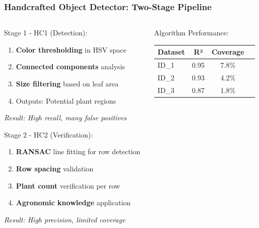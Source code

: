 \documentclass[aspectratio=43]{beamer}
\begin{document}
\begin{frame}
    \frametitle{Handcrafted Object Detector: Two-Stage Pipeline}
    
    \begin{columns}
        \begin{column}{0.5\textwidth}
            \begin{block}{Stage 1 - HC1 (Detection):}
                \small
                \begin{enumerate}
                    \item \textbf{Color thresholding} in HSV space
                    \item \textbf{Connected components} analysis
                    \item \textbf{Size filtering} based on leaf area
                    \item Outputs: Potential plant regions
                \end{enumerate}
                
                \textit{Result: High recall, many false positives}
            \end{block}
            
            \begin{block}{Stage 2 - HC2 (Verification):}
                \small
                \begin{enumerate}
                    \item \textbf{RANSAC} line fitting for row detection
                    \item \textbf{Row spacing} validation
                    \item \textbf{Plant count} verification per row
                    \item \textbf{Agronomic knowledge} application
                \end{enumerate}
                
                \textit{Result: High precision, limited coverage}
            \end{block}
        \end{column}
        
        \begin{column}{0.5\textwidth}
            \begin{exampleblock}{Algorithm Performance:}
                \small
                \begin{center}
                    \scriptsize
                    \begin{tabular}{lccc}
                        \textbf{Dataset} & \textbf{R²} & \textbf{Coverage} \\
                        \hline
                        ID\_1 & 0.95 & 7.8\% \\
                        ID\_2 & 0.93 & 4.2\% \\
                        ID\_3 & 0.87 & 1.8\% \\
                    \end{tabular}
                \end{center}
            \end{exampleblock}
            

\end{column}
\end{columns}
\end{frame}
\end{document}
